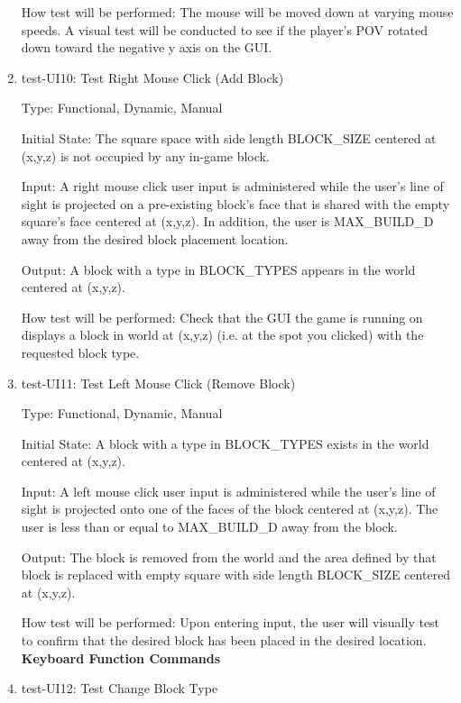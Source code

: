 \documentclass[12pt, titlepage]{article}
\begin{document}
\begin{enumerate}
How test will be performed: The mouse will be moved down at varying mouse speeds. A visual test will be conducted to see if the player's POV rotated down toward the negative y axis on the GUI.

\item{test-UI10: Test Right Mouse Click (Add Block)\\}

Type: Functional, Dynamic, Manual
					
Initial State: The square space with side length BLOCK\_SIZE centered at (x,y,z) is not occupied by any in-game block.
					
Input: A right mouse click user input is administered while the user's line of sight is projected on a pre-existing block's face that is shared with the empty square's face centered at (x,y,z). In addition, the user is MAX\_BUILD\_D away from the desired block placement location.
					
Output: A block with a type in BLOCK\_TYPES appears in the world centered at (x,y,z).
					
How test will be performed: Check that the GUI the game is running on displays a block in world at (x,y,z) (i.e. at the spot you clicked) with the requested block type.
	
\item{test-UI11: Test Left Mouse Click (Remove Block)\\}

Type: Functional, Dynamic, Manual
					
Initial State: A block with a type in BLOCK\_TYPES exists in the world centered at (x,y,z).
					
Input: A left mouse click user input is administered while the user's line of sight is projected onto one of the faces of the block centered at (x,y,z). The user is less than or equal to MAX\_BUILD\_D away from the block.
					
Output: The block is removed from the world and the area defined by that block is replaced with empty square with side length BLOCK\_SIZE centered at (x,y,z).
					
How test will be performed: Upon entering input, the user will visually test to confirm that the desired block has been placed in the desired location.\\
	
\textbf{Keyboard Function Commands}

\item{test-UI12: Test Change Block Type\\}


\end{enumerate}
\end{document}
